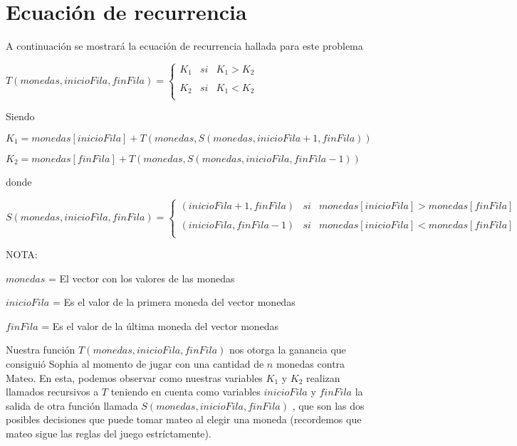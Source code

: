 \section{Ecuación de recurrencia}

A continuación se mostrará la ecuación de recurrencia hallada para este
problema

\vskip0.5cm

\begin{center}
  
    $T(monedas, inicioFila, finFila) = \left\{ \begin{array}{lcc} K_{1} & si & K_{1} > K_{2} \\ \\ K_{2} & si & K_{1} < K_{2} \\  \end{array} \right.$

\end{center}

Siendo 

\vskip0.25cm

\begin{center}
  
    $K_{1} = monedas[inicioFila] + T(monedas, S(monedas, inicioFila + 1, finFila))$

    \vskip0.1cm
    $K_{2} = monedas[finFila] + T(monedas, S(monedas, inicioFila, finFila - 1))$
\end{center}


donde


$S(monedas, inicioFila, finFila) = \left\{ \begin{array}{lcc} (inicioFila+1,finFila) & si & monedas[inicioFila] > monedas[finFila] \\ \\ (inicioFila, finFila - 1) & si &  monedas[inicioFila] < monedas[finFila] \\  \end{array} \right.$

\vskip0.5cm

NOTA: 

$monedas$ = El vector con los valores de las monedas

$inicioFila$ = Es el valor de la primera moneda del vector monedas

$finFila$ = Es el valor de la última moneda del vector monedas

\vskip0.5cm

Nuestra función $T(monedas, inicioFila, finFila)$ nos otorga la ganancia que consiguió Sophia al momento de jugar con una cantidad de $n$ monedas contra Mateo. En esta, podemos observar como nuestras variables $K_{1}$ y $K_{2}$
realizan llamados recursivos a $T$ teniendo en cuenta como variables $inicioFila$ y $finFila$ la salida de otra función llamada $S(monedas, inicioFila, finFila)$ , que son las dos posibles decisiones que puede tomar mateo al elegir una moneda (recordemos que mateo sigue las reglas del juego estríctamente).